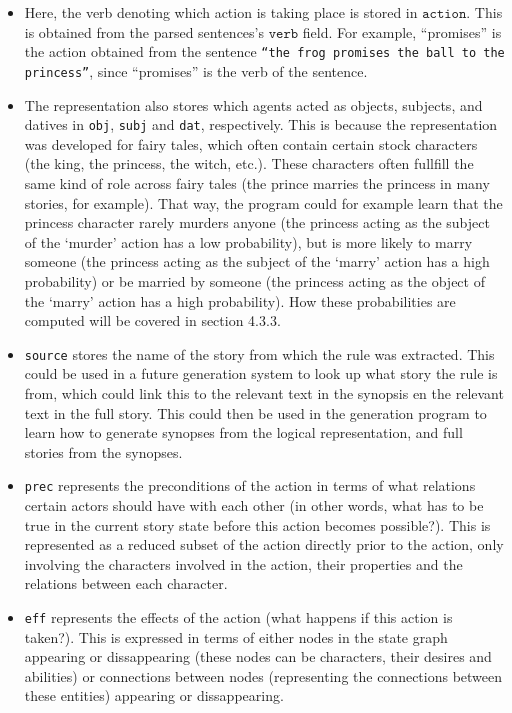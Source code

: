 \begin{itemize}
\item Here, the verb denoting which action is taking place is stored in 
$\texttt{action}$.
This is obtained from the parsed sentences's $\texttt{verb}$ field.
For example, ``promises'' is the action obtained from the
sentence \texttt{``the frog promises the ball to the princess''}, since
``promises'' is the verb of the sentence.

\item The representation also stores which agents
acted as objects, subjects, and datives in 
\texttt{obj}, \texttt{subj} and \texttt{dat}, respectively.
This is because the representation was developed for fairy tales, which often contain certain stock 
characters (the king, the princess, the witch, etc.). These characters often
fullfill the same kind of role across fairy tales (the prince marries the
princess in many stories, for example).
That way, the program
could for example learn that the princess character rarely murders anyone
(the princess acting as the subject of the `murder' action has a low probability), but
is more likely to marry someone (the princess acting as the subject of the
`marry' action has a high probability) or
be married by someone (the princess acting as the object of the `marry' action
has a high probability). How these probabilities are computed will be covered in
section 4.3.3.

\item \texttt{source} stores the name of the story from which the rule was extracted.
This could be used in a future generation system to look up what story the rule
is from, which could link this to the relevant text in the synopsis en the
relevant text in the full story. This could then be used in the generation
program to learn how to generate synopses from the logical representation, and
full stories from the synopses.

\item \texttt{prec} represents the preconditions of the action in terms of what 
relations certain actors should have with each other (in other words, what has
to be true in the current story state before this action becomes possible?).
This is represented as a reduced subset of the action directly prior to the
action, only involving the characters involved in the action, their properties
and the relations between each character.

\item \texttt{eff} represents the effects of the action (what
happens if this action is taken?). This is expressed in terms of either nodes in the
state graph appearing or dissappearing (these nodes can be characters, their
desires and abilities) or connections between nodes (representing the
connections between these entities) appearing or dissappearing.


\end{itemize}
